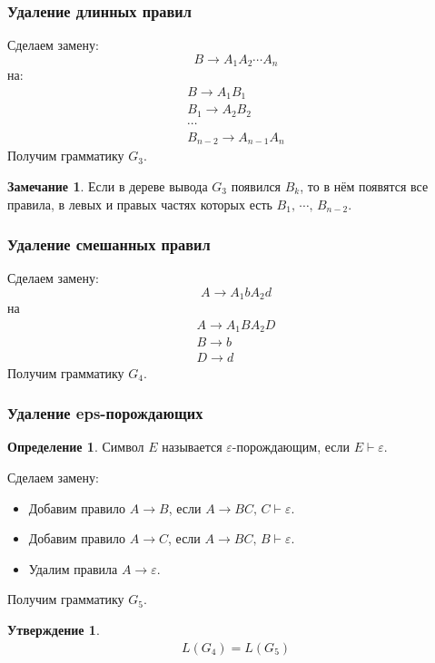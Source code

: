 \documentclass[a4paper,12pt]{article}
\theoremstyle{plain}
\newtheorem{proposition}{Утверждение}[subsection]
\theoremstyle{definition}
\newtheorem{definition}{Определение}[subsection]
\newtheorem*{note}{Замечание}
\theoremstyle{remark}
\begin{document}
\subsubsection*{Удаление длинных правил}
Сделаем замену:
\[
	B \to A_1A_2\cdots A_n
\]
на:
\begin{align*}
	B \to A_1B_1   \\
	B_1 \to A_2B_2 \\
	\cdots         \\
	B_{n - 2} \to A_{n - 1}A_n
\end{align*}
Получим грамматику $G_3$.

\begin{note}
	Если в дереве вывода $G_3$ появился $B_k$, то в нём появятся все правила, в левых и правых частях которых есть $B_1,\,\cdots,\,B_{n-2}$.
\end{note}

\subsubsection*{Удаление смешанных правил}
Сделаем замену:
\[
	A \to A_1bA_2d
\]
на
\begin{align*}
	A \to A_1BA_2D \\
	B \to b        \\
	D \to d
\end{align*}
Получим грамматику $G_4$.

\subsubsection*{Удаление eps-порождающих}
\begin{definition}
	Символ $E$ называется $\varepsilon$-порождающим, если $E \vdash \varepsilon$.
\end{definition}

Сделаем замену:
\begin{itemize}
	\item Добавим правило $A \to B$, если $A \to BC,\, C \vdash \varepsilon$.
	\item Добавим правило $A \to C$, если $A \to BC,\, B \vdash \varepsilon$.
	\item Удалим правила $A \to \varepsilon$.
\end{itemize}
Получим грамматику $G_5$.

\begin{proposition}
	\begin{align*}
		L(G_4) = L(G_5)
	\end{align*}
\end{proposition}
\end{document}
